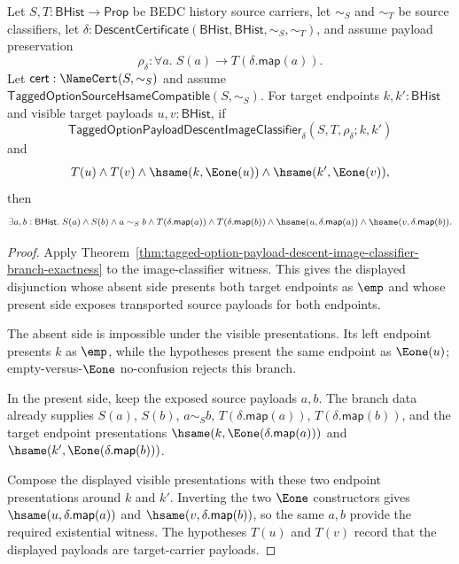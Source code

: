 \begin{theorem}
\label{thm:tagged-option-payload-descent-image-classifier-visible-payload-readback}
Let $S,T:\mathsf{BHist}\to\mathsf{Prop}$ be BEDC history source carriers, let
$\sim_S$ and $\sim_T$ be source classifiers, let
$\delta:\mathsf{DescentCertificate}(\mathsf{BHist},\mathsf{BHist},\sim_S,\sim_T)$,
and assume payload preservation
$$
\rho_{\delta}:\forall a.\;S(a)\to T(\delta.\mathsf{map}(a)).
$$
Let $\mathsf{cert}:\NameCert(S,\sim_S)$ and assume
$\mathsf{TaggedOptionSourceHsameCompatible}(S,\sim_S)$. For target endpoints
$k,k':\mathsf{BHist}$ and visible target payloads $u,v:\mathsf{BHist}$, if
$$
\mathsf{TaggedOptionPayloadDescentImageClassifier}_{\delta}
(S,T,\rho_{\delta};k,k')
$$
and
$$
T(u)\land T(v)\land
\hsame(k,\Eone(u))\land
\hsame(k',\Eone(v)),
$$
then
$$
\exists a,b:\mathsf{BHist}.\;
S(a)\land S(b)\land a\sim_S b\land
T(\delta.\mathsf{map}(a))\land T(\delta.\mathsf{map}(b))\land
\hsame(u,\delta.\mathsf{map}(a))\land
\hsame(v,\delta.\mathsf{map}(b)).
$$
\end{theorem}
\begin{proof}
Apply Theorem~\ref{thm:tagged-option-payload-descent-image-classifier-branch-exactness}
to the image-classifier witness. This gives the displayed disjunction whose
absent side presents both target endpoints as $\emp$ and whose present side
exposes transported source payloads for both endpoints.

The absent side is impossible under the visible presentations. Its left endpoint
presents $k$ as $\emp$, while the hypotheses present the same endpoint as
$\Eone(u)$; empty-versus-$\Eone$ no-confusion rejects this branch.

In the present side, keep the exposed source payloads $a,b$. The branch data
already supplies $S(a)$, $S(b)$, $a\sim_S b$,
$T(\delta.\mathsf{map}(a))$, $T(\delta.\mathsf{map}(b))$, and the target endpoint
presentations $\hsame(k,\Eone(\delta.\mathsf{map}(a)))$ and
$\hsame(k',\Eone(\delta.\mathsf{map}(b)))$.

Compose the displayed visible presentations with these two endpoint
presentations around $k$ and $k'$. Inverting the two $\Eone$ constructors gives
$\hsame(u,\delta.\mathsf{map}(a))$ and
$\hsame(v,\delta.\mathsf{map}(b))$, so the same $a,b$ provide the required
existential witness. The hypotheses $T(u)$ and $T(v)$ record that the displayed
payloads are target-carrier payloads.
\end{proof}

